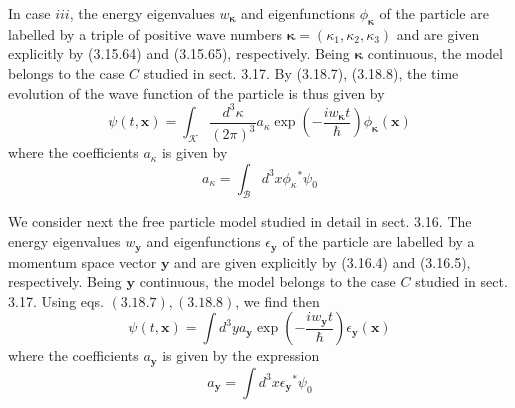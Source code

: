 \documentclass{article}
\begin{document}
In case $i i i$, the energy eigenvalues $w_{\boldsymbol{\kappa}}$ and eigenfunctions $\phi_{\boldsymbol{\kappa}}$ of the particle are labelled by a triple of positive wave numbers $\boldsymbol{\kappa}=\left(\kappa_{1}, \kappa_{2}, \kappa_{3}\right)$ and are given explicitly by (3.15.64) and (3.15.65), respectively. Being $\boldsymbol{\kappa}$ continuous, the model belongs to the case $C$ studied in sect. 3.17. By (3.18.7), (3.18.8), the time evolution of the wave function of the particle is thus given by
$$
\begin{equation*}
\psi(t, \boldsymbol{x})=\int_{\mathcal{K}} \frac{d^{3} \kappa}{(2 \pi)^{3}} a_{\kappa} \exp \left(-\frac{i w_{\boldsymbol{\kappa}} t}{\hbar}\right) \phi_{\boldsymbol{\kappa}}(\boldsymbol{x}) \tag{3.19.8}
\end{equation*}
$$
where the coefficients $a_{\kappa}$ is given by
$$
\begin{equation*}
a_{\kappa}=\int_{\mathcal{B}} d^{3} x \phi_{\kappa}{ }^{*} \psi_{0} \tag{3.19.9}
\end{equation*}
$$

We consider next the free particle model studied in detail in sect. 3.16. The
energy eigenvalues $w_{\boldsymbol{y}}$ and eigenfunctions $\epsilon_{\boldsymbol{y}}$ of the particle are labelled by a momentum space vector $\boldsymbol{y}$ and are given explicitly by (3.16.4) and (3.16.5), respectively. Being $\boldsymbol{y}$ continuous, the model belongs to the case $C$ studied in sect. 3.17. Using eqs. $(3.18 .7),(3.18 .8)$, we find then
$$
\begin{equation*}
\psi(t, \boldsymbol{x})=\int d^{3} y a_{\boldsymbol{y}} \exp \left(-\frac{i w_{\boldsymbol{y}} t}{\hbar}\right) \epsilon_{\boldsymbol{y}}(\boldsymbol{x}) \tag{3.19.10}
\end{equation*}
$$
where the coefficients $a_{\boldsymbol{y}}$ is given by the expression
$$
\begin{equation*}
a_{\boldsymbol{y}}=\int d^{3} x \epsilon_{\boldsymbol{y}}{ }^{*} \psi_{0} \tag{3.19.11}
\end{equation*}
$$
\end{document}
